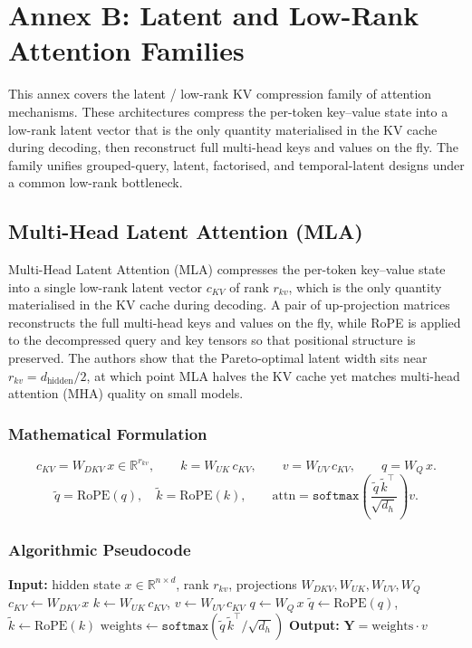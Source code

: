 \section{Annex B: Latent and Low-Rank Attention Families}
\label{sec:annex-latent}

This annex covers the latent / low-rank KV compression family of attention mechanisms. These architectures compress the per-token key--value state into a low-rank latent vector that is the only quantity materialised in the KV cache during decoding, then reconstruct full multi-head keys and values on the fly. The family unifies grouped-query, latent, factorised, and temporal-latent designs under a common low-rank bottleneck.

\subsection{Multi-Head Latent Attention (MLA)}
Multi-Head Latent Attention (MLA) \citep{mehta_mla_2025} compresses the per-token key--value state into a single low-rank latent vector $c_{KV}$ of rank $r_{kv}$, which is the only quantity materialised in the KV cache during decoding. A pair of up-projection matrices reconstructs the full multi-head keys and values on the fly, while RoPE is applied to the decompressed query and key tensors so that positional structure is preserved. The authors show that the Pareto-optimal latent width sits near $r_{kv} = d_{\text{hidden}} / 2$, at which point MLA halves the KV cache yet matches multi-head attention (MHA) quality on small models.

\subsubsection{Mathematical Formulation}
\[
c_{KV} = W_{DKV}\, x \in \mathbb{R}^{r_{kv}}, \qquad
k = W_{UK}\, c_{KV}, \qquad
v = W_{UV}\, c_{KV}, \qquad
q = W_{Q}\, x.
\]
\[
\tilde q = \text{RoPE}(q), \quad \tilde k = \text{RoPE}(k), \qquad
\text{attn} = \texttt{softmax}\!\left(\frac{\tilde q\, \tilde k^\top}{\sqrt{d_h}}\right) v.
\]

\subsubsection{Algorithmic Pseudocode}
\begin{algorithmic}[1]
\State \textbf{Input:} hidden state $x \in \mathbb{R}^{n \times d}$, rank $r_{kv}$, projections $W_{DKV}, W_{UK}, W_{UV}, W_{Q}$
\State $c_{KV} \gets W_{DKV}\, x$ 
\State $k \gets W_{UK}\, c_{KV}$, \quad $v \gets W_{UV}\, c_{KV}$ 
\State $q \gets W_{Q}\, x$
\State $\tilde q \gets \text{RoPE}(q)$, \quad $\tilde k \gets \text{RoPE}(k)$ 
\State $\text{weights} \gets \texttt{softmax}(\tilde q\, \tilde k^\top / \sqrt{d_h})$
\State \textbf{Output:} $\mathbf{Y} = \text{weights} \cdot v$
\end{algorithmic}

